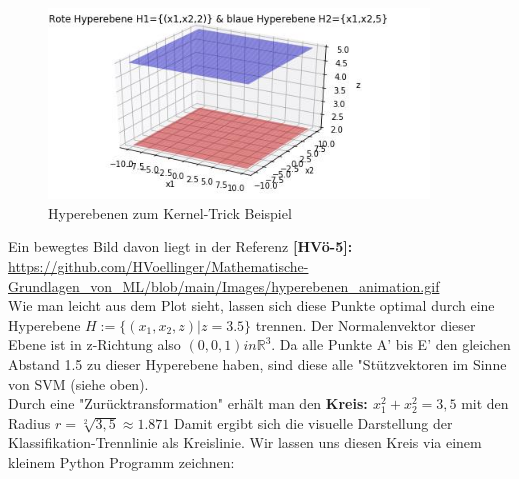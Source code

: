 \documentclass[12pt]{article}
\begin{document}
\begin{figure}[ht]
  \centering
  \hspace*{-0.5cm} 
  \includegraphics[width=0.9\textwidth]{Kernel-Hyperebene-Bild}
  \caption{Hyperebenen zum Kernel-Trick Beispiel}
  \label{fig:SVM_Ebenen}
\end{figure}
%
Ein bewegtes Bild davon liegt in der Referenz \textbf{[HVö-5]:} \url{https://github.com/HVoellinger/Mathematische-Grundlagen_von_ML/blob/main/Images/hyperebenen_animation.gif}\\[0.2cm]
%
Wie man leicht aus dem Plot sieht, lassen sich diese Punkte optimal durch eine Hyperebene ${H := \lbrace (x_1,x_2,z)| z=3.5\rbrace}$ trennen. Der Normalenvektor dieser Ebene ist in z-Richtung also $(0,0,1) in \mathbb{R}^3 $. Da alle Punkte A' bis E' den gleichen Abstand 1.5 zu dieser Hyperebene haben, sind diese alle "Stützvektoren im Sinne von SVM (siehe oben). \\ 
Durch eine "Zurücktransformation" erhält man den \textbf{Kreis: $x_1^2+x_2^2=3,5$ } mit den Radius $r = \sqrt[2]{3,5} \approx 1.871 $  Damit ergibt sich die visuelle Darstellung der Klassifikation-Trennlinie als Kreislinie. Wir lassen uns diesen Kreis via einem kleinem Python Programm zeichnen:\\[0.2cm]
\end{document}
